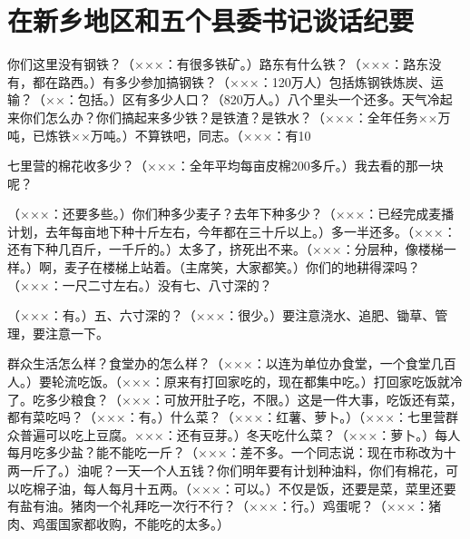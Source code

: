 \section[在新乡地区和五个县委书记谈话纪要（一九五八年十一月一日）]{在新乡地区和五个县委书记谈话纪要}


你们这里没有钢铁？（×××：有很多铁矿。）路东有什么铁？（×××：路东没有，都在路西。）有多少参加搞钢铁？（×××：120万人）包括炼钢铁炼炭、运输？（××：包括。）区有多少人口？（820万人。）八个里头一个还多。天气冷起来你们怎么办？你们搞起来多少铁？是铁渣？是铁水？（×××：全年任务××万吨，已炼铁××万吨。）不算铁吧，同志。（×××：有10%

七里营的棉花收多少？（×××：全年平均每亩皮棉200多斤。）我去看的那一块呢？

（×××：还要多些。）你们种多少麦子？去年下种多少？（×××：已经完成麦播计划，去年每亩地下种十斤左右，今年都在三十斤以上。）多一半还多。（×××：还有下种几百斤，一千斤的。）太多了，挤死出不来。（×××：分层种，像楼梯一样。）啊，麦子在楼梯上站着。（主席笑，大家都笑。）你们的地耕得深吗？（×××：一尺二寸左右。）没有七、八寸深的？

（×××：有。）五、六寸深的？（×××：很少。）要注意浇水、追肥、锄草、管理，要注意一下。

群众生活怎么样？食堂办的怎么样？（×××：以连为单位办食堂，一个食堂几百人。）要轮流吃饭。（×××：原来有打回家吃的，现在都集中吃。）打回家吃饭就冷了。吃多少粮食？（×××：可放开肚子吃，不限。）这是一件大事，吃饭还有菜，都有菜吃吗？（×××：有。）什么菜？（×××：红薯、萝卜。）（×××：七里营群众普遍可以吃上豆腐。×××：还有豆芽。）冬天吃什么菜？（×××：萝卜。）每人每月吃多少盐？能不能吃一斤？（×××：差不多。一个同志说：现在市称改为十两一斤了。）油呢？一天一个人五钱？你们明年要有计划种油料，你们有棉花，可以吃棉子油，每人每月十五两。（×××：可以。）不仅是饭，还要是菜，菜里还要有盐有油。猪肉一个礼拜吃一次行不行？（×××：行。）鸡蛋呢？（×××：猪肉、鸡蛋国家都收购，不能吃的太多。）

